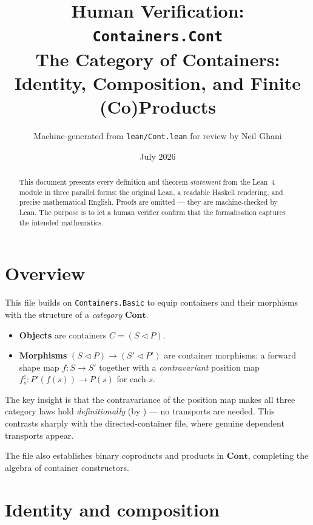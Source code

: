 \documentclass[11pt,a4paper]{article}
\title{Human Verification: \texttt{Containers.Cont}\\[4pt]
  \large The Category of Containers: Identity, Composition, and Finite (Co)Products}
\author{Machine-generated from \texttt{lean/Cont.lean} for review by Neil Ghani}
\date{July 2026}
\begin{document}
\maketitle

\begin{abstract}
This document presents every definition and theorem \emph{statement} from the
Lean~4 module  in three parallel forms: the original
Lean, a readable Haskell rendering, and precise mathematical English.  Proofs
are omitted --- they are machine-checked by Lean.  The purpose is to let a
human verifier confirm that the formalisation captures the intended mathematics.
\end{abstract}

\tableofcontents
\bigskip

\section{Overview}

This file builds on \texttt{Containers.Basic} to equip containers and their
morphisms with the structure of a \emph{category} $\mathbf{Cont}$.

\begin{itemize}
  \item \textbf{Objects} are containers $C = (S \triangleleft P)$.
  \item \textbf{Morphisms} $(S \triangleleft P) \to (S' \triangleleft P')$ are
        container morphisms: a forward shape map $f : S \to S'$ together with a
        \emph{contravariant} position map $f^\sharp_s : P'(f(s)) \to P(s)$ for
        each $s$.
\end{itemize}

The key insight is that the contravariance of the position map makes all three
category laws hold \emph{definitionally} (by ) --- no transports are
needed.  This contrasts sharply with the directed-container file, where genuine
dependent transports appear.

The file also establishes binary coproducts and products in $\mathbf{Cont}$,
completing the algebra of container constructors.

\section{Identity and composition}
\end{document}
